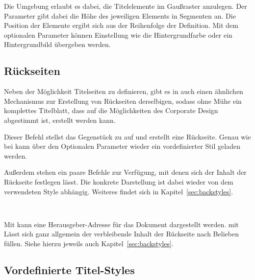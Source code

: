 Die Umgebung  erlaubt es dabei, die Titelelemente im 
Gaußraster anzulegen. Der Parameter  gibt dabei
die Höhe des jeweiligen Elements in Segmenten an. Die Position der Elemente
ergibt sich aus der Reihenfolge der Definition.
Mit dem optionalen Parameter  können Einstellung wie die Hintergrundfarbe oder ein Hintergrundbild übergeben werden.

\subsection{Rückseiten}\label{subsec:backpages}

Neben der Möglichkeit Titelseiten zu definieren, gibt es in \tubslatex auch
einen ähnlichen Mechanismus zur Erstellung von Rückseiten derselbigen, sodass
ohne Mühe ein komplettes Titelblatt, dass auf die Möglichkeiten des
Corporate Design abgestimmt ist, erstellt werden kann.

\begin{Declaration}
\end{Declaration}

Dieser Befehl stellst das Gegenstück zu  auf und erstellt eine
Rückseite. Genau wie bei  kann über den Optionalen Parameter
 wieder ein vordefinierter Stil geladen werden.

Außerdem stehen ein paare Befehle zur Verfügung, mit denen sich der Inhalt
der Rückseite festlegen lässt. Die konkrete Darstellung ist dabei wieder
von dem verwendeten Style abhängig. Weiteres findet sich in 
Kapitel~\ref{sec:backstyles}.


\begin{Declaration}
  \\
\end{Declaration}

Mit  kann eine Herausgeber-Adresse für das Dokument
dargestellt werden.
mit  Lässt sich ganz allgemein der verbleibende
Inhalt der Rückseite nach Belieben füllen.
Siehe hierzu jeweils auch Kapitel~\ref{sec:backstyles}.

\subsection{Vordefinierte Titel-Styles}\label{sec:titlestyles}



